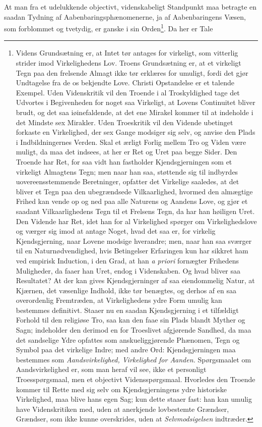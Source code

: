 \documentclass[12pt]{article}
\begin{document}
At man fra et udelukkende objectivt, videnskabeligt Standpunkt maa
betragte en saadan Tydning af Aabenbaringsphænomenerne, ja af
Aabenbaringens Væsen, som forblommet og tvetydig, er ganske i sin
Orden\footnote{Videns Grundsætning er, at Intet tør antages for
virkeligt, som vitterlig strider imod Virkelighedens Lov. Troens
Grundsætning er, at et virkeligt Tegn paa den frelsende Almagt ikke tør
erklæres for umuligt, fordi det gjør Undtagelse fra de os bekjendte
Love. Christi Opstandelse er et talende Exempel. Uden Videnskritik vil
den Troende i al Troskyldighed tage det Udvortes i Begivenheden for
noget saa Virkeligt, at Lovens Continuitet bliver brudt, og det saa
iøinefaldende, at det ene Mirakel kommer til at indeholde i det Mindste
sex Mirakler. Uden Troeskritik vil den Vidende ubetinget forkaste en
Virkelighed, der sex Gange modsiger sig selv, og anvise den Plads i
Indbildningernes Verden. Skal et ærligt Forlig mellem Tro og Viden være
muligt, da maa det indsees, at her er Ret og Uret paa begge Sider. Den
Troende har Ret, for saa vidt han fastholder Kjendsgjerningen som et
virkeligt Almagtens Tegn; men naar han saa, støttende sig til indbyrdes
uovereensstemmende Beretninger, opfatter det Virkelige saaledes, at det
bliver et Tegn paa den ubegrændsede Vilkaarlighed, hvormed den almægtige
Frihed kan vende op og ned paa alle Naturens og Aandens Love, og gjør
et saadant Vilkaarlighedens Tegn til et Frelsens Tegn, da har han
høiligen Uret. Den Vidende har Ret, idet han for al Virkelighed spørger
om Virkelighedslove og værger sig imod at antage Noget, hvad det saa
er, for virkelig Kjendsgjerning, naar Lovene modsige hverandre; men,
naar han saa sværger til en Naturnødvendighed, hvis Betingelser
Erfaringen kun har sikkret ham ved empirisk Induction, i den Grad, at
han \textit{a priori} fornægter Frihedens Muligheder, da faaer han
Uret, endog i Videnskaben. Og hvad
bliver saa Resultatet? At der kan gives Kjendsgjerninger af saa
eiendommelig Natur, at Kjærnen, det væsenlige Indhold, ikke tør
benægtes, og derhos af en saa overordenlig Fremtræden, at Virkelighedens
ydre Form umulig kan bestemmes definitivt. Staaer nu en saadan
Kjendsgjerning i et tilfældigt Forhold til den religiøse Tro, saa kan
den faae sin Plads blandt Myther og Sagn; indeholder den derimod en for
Troeslivet afgjørende Sandhed, da maa det sandselige Ydre opfattes som
anskueliggjørende Phænomen, Tegn og Symbol paa det virkelige Indre; med
andre Ord: Kjendsgjerningen maa bestemmes som \emph{Aandsvirkelighed,
Virkelighed for Aanden.} Spørgsmaalet om Aandsvirkelighed er, som man
heraf vil see, ikke et personligt Troesspørgsmaal, men et objectivt
Vidensspørgsmaal. Hvorledes den Troende kommer til Rette med sig selv
om Kjendsgjerningens ydre historiske Virkelighed, maa blive hans egen
Sag; kun dette staaer fast: han kan umulig have Videnskritiken med,
uden at anerkjende lovbestemte Grændser, Grændser, som ikke kunne
overskrides, uden at \emph{Selvmodsigelsen} indtræder.}. Da her er Tale
\end{document}
